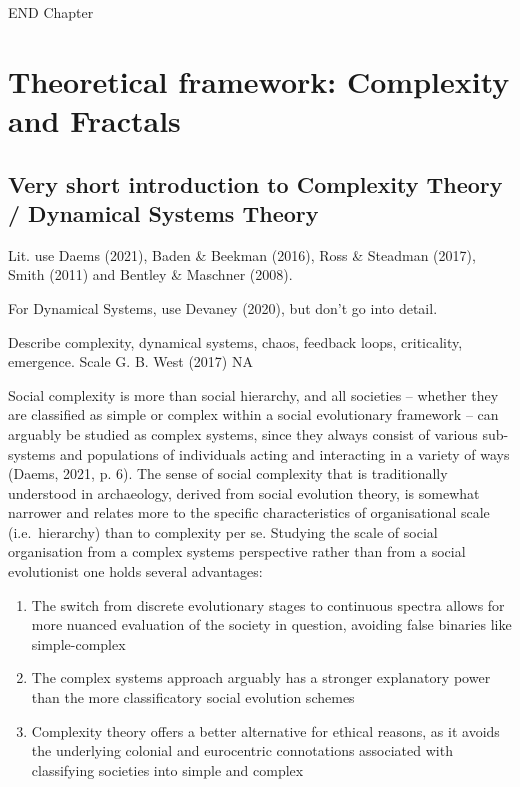\documentclass[
  12pt,
]{book}
\begin{document}
END Chapter

\hypertarget{theory}{%
\chapter{Theoretical framework: Complexity and Fractals}\label{theory}}

\hypertarget{very-short-introduction-to-complexity-theory-dynamical-systems-theory}{%
\section{Very short introduction to Complexity Theory / Dynamical Systems Theory}\label{very-short-introduction-to-complexity-theory-dynamical-systems-theory}}

Lit. use Daems (2021), Baden \& Beekman (2016), Ross \& Steadman (2017), Smith (2011) and Bentley \& Maschner (2008).

For Dynamical Systems, use Devaney (2020), but don't go into detail.

Describe complexity, dynamical systems, chaos, feedback loops, criticality, emergence. Scale G. B. West (2017) NA

Social complexity is more than social hierarchy, and all societies -- whether they are classified as simple or complex within a social evolutionary framework -- can arguably be studied as complex systems, since they always consist of various sub-systems and populations of individuals acting and interacting in a variety of ways (Daems, 2021, p. 6). The sense of social complexity that is traditionally understood in archaeology, derived from social evolution theory, is somewhat narrower and relates more to the specific characteristics of organisational scale (i.e.~hierarchy) than to complexity per se. Studying the scale of social organisation from a complex systems perspective rather than from a social evolutionist one holds several advantages:

\begin{enumerate}
\def\labelenumi{\arabic{enumi}.}
\item
  The switch from discrete evolutionary stages to continuous spectra allows for more nuanced evaluation of the society in question, avoiding false binaries like simple-complex
\item
  The complex systems approach arguably has a stronger explanatory power than the more classificatory social evolution schemes
\item
  Complexity theory offers a better alternative for ethical reasons, as it avoids the underlying colonial and eurocentric connotations associated with classifying societies into simple and complex
\end{enumerate}
\end{document}
